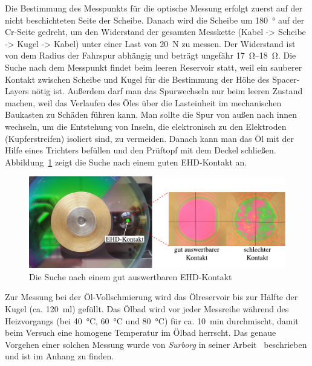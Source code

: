 Die Bestimmung des Messpunkts für die optische Messung erfolgt zuerst auf der nicht beschichteten Seite der Scheibe.
Danach wird die Scheibe um \SI{180}{\degree} auf der Cr-Seite gedreht, um den Widerstand der gesamten Messkette (Kabel -> Scheibe -> Kugel -> Kabel) unter einer Last von \SI{20}{\newton} zu messen.
Der Widerstand ist von dem Radius der Fahrspur abhängig und beträgt ungefähr \SIrange{17}{18}{\ohm}.
Die Suche nach dem Messpunkt findet beim leeren Reservoir statt, weil ein sauberer Kontakt zwischen Scheibe und Kugel für die Bestimmung der Höhe des Spacer-Layers nötig ist.
Außerdem darf man das Spurwechseln nur beim leeren Zustand machen, weil das Verlaufen des Öles über die Lasteinheit im mechanischen Baukasten zu Schäden führen kann.
Man sollte die Spur von außen nach innen wechseln, um die Entstehung von Inseln, die elektronisch zu den Elektroden (Kupferstreifen) isoliert sind, zu vermeiden.
Danach kann man das Öl mit der Hilfe eines Trichters befüllen und den Prüftopf mit dem Deckel schließen.
Abbildung~\ref{fig:suche_nach_ehd_kontakt} zeigt die Suche nach einem guten EHD-Kontakt an.

\begin{figure}[htb]
    \centering
    \includegraphics[]{./images/suche_nach_ehd_kontakt.pdf}
    \caption{Die Suche nach einem gut auswertbaren EHD-Kontakt}
    \label{fig:suche_nach_ehd_kontakt}
\end{figure}

Zur Messung bei der Öl-Vollschmierung wird das Ölreservoir bis zur Hälfte der Kugel (ca. \SI{120}{\ml}) gefüllt.
Das Ölbad wird vor jeder Messreihe während des Heizvorgangs (bei \SI{40}{\degreeCelsius}, \SI{60}{\degreeCelsius} und \SI{80}{\degreeCelsius}) für ca. \SI{10}{\minute} durchmischt, damit beim Versuch eine homogene Temperatur im Ölbad herrscht.
Das genaue Vorgehen einer solchen Messung wurde von \textit{Surborg} in seiner Arbeit~\cite{surborg_2007} beschrieben und ist im Anhang zu finden.

